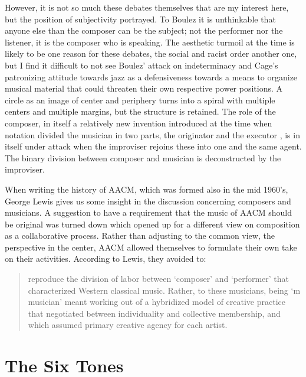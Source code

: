 \documentclass[a4paper]{article}
\begin{document}
However, it is not so much these debates themselves that are my interest here, but the position of subjectivity portrayed. To Boulez it is unthinkable that anyone else than the composer can be the subject; not the performer nor the listener, it is the composer who is speaking. The aesthetic turmoil at the time is likely to be one reason for these debates, the social and racist order another one, but I find it difficult to not see Boulez' attack on indeterminacy and Cage's patronizing attitude towards jazz as a defensiveness towards a means to organize musical material that could threaten their own respective power positions. A circle as an image of center and periphery turns into a spiral with multiple centers and multiple margins, but the structure is retained. The role of the composer, in itself a relatively new invention introduced at the time when notation divided the musician in two parts, the originator and the executor \citep{wis96,frisk-ost06-2}, is in itself under attack when the improviser rejoins these into one and the same agent. The binary division between composer and musician is deconstructed by the improviser.

When writing the history of AACM, which was formed also in the mid 1960's, George Lewis gives us some insight in the discussion concerning composers and musicians. A suggestion to have a requirement that the music of AACM should be original was turned down which opened up for a different view on composition as a collaborative process. Rather than adjusting to the common view, the perspective in the center, AACM allowed themselves to formulate their own take on their activities. According to Lewis, they avoided to:

\begin{quote}
  reproduce the division of labor between `composer' and `performer' that characterized Western classical   music. Rather, to these musicians, being `m musician' meant working out of a hybridized model of creative   practice that negotiated between individuality and collective membership, and which assumed primary   creative agency for each artist. \citep[p. 103]{lewis2008}
\end{quote}

\section*{The Six Tones}
\label{sec:tu-dai-oan}
\end{document}
